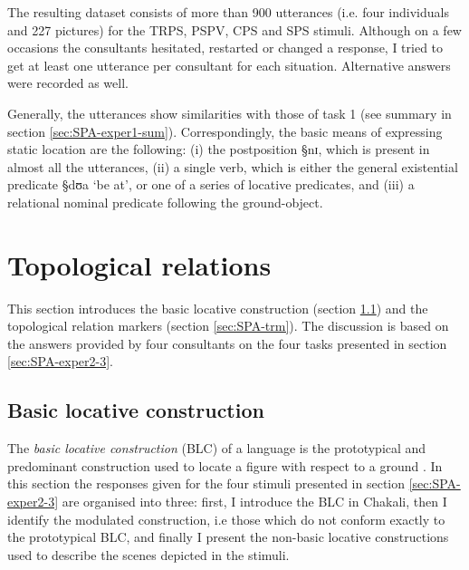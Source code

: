 The resulting dataset consists of more than 900  utterances (i.e.
four
individuals and 227  pictures)  for the TRPS, PSPV, CPS and  SPS
stimuli. Although on a few occasions the consultants hesitated,
restarted or changed a response, I tried to  get  at least one utterance per
consultant for each situation. Alternative answers were recorded as well.



Generally, the utterances show similarities with those of task 1  (see summary
in section \ref{sec:SPA-exper1-sum}). Correspondingly, the basic means of
expressing static location are the following: (i) the postposition {\S nɪ}, 
which is present in almost all the utterances, (ii) a single verb, which is
either the general existential predicate {\S dʊa} `be at',  or one of a series
of locative predicates, and (iii) a relational nominal predicate following the
ground-object. 


\section{Topological relations}
\label{sec:SPA-tr}

This section introduces the basic locative construction (section
\ref{sec:SPA-blc}) and the topological relation markers (section
\ref{sec:SPA-trm}). The discussion is based on the answers provided by four
consultants on the four tasks presented in section \ref{sec:SPA-exper2-3}.


\subsection{Basic locative construction}
\label{sec:SPA-blc}

The {\it basic locative
construction} (BLC) of a language is  the prototypical  and predominant
construction used to locate a figure with respect to a ground \cite[15]{Levi06}.
In this section the responses given for the four stimuli presented in section
\ref{sec:SPA-exper2-3}  are organised
into three:
first, I introduce the BLC in Chakali, then I identify the modulated
construction, i.e those which do not conform exactly to the prototypical BLC,
and finally  I present the non-basic locative
constructions used to describe the scenes depicted in the stimuli.


